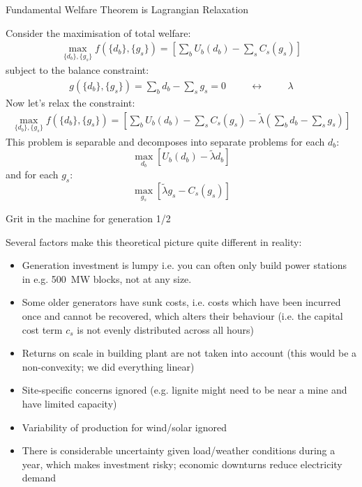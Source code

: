\documentclass[10pt,aspectratio=169,dvipsnames]{beamer}
\def\l{\lambda}
\let\olditem\item
\renewcommand{\item}{%
\olditem\vspace{5pt}}
\begin{document}
\begin{frame}{Fundamental Welfare Theorem is Lagrangian Relaxation}

  Consider the maximisation of total welfare:
  \begin{align*}
    \max_{\{d_b\}, \{g_s\}} f(\{d_b\}, \{g_s\}) = \left[ \sum_b U_b (d_b)  -  \sum_s C_s (g_s) \right]
  \end{align*}
  subject to the balance constraint:
  \begin{align*}
    g(\{d_b\}, \{g_s\}) = \sum_b d_b -  \sum_s g_s  = 0 \hspace{1cm} \leftrightarrow \hspace{1cm} \l
  \end{align*}
  Now let's relax the constraint:
  \begin{align*}
    \max_{\{d_b\}, \{g_s\}} f(\{d_b\}, \{g_s\}) = \left[ \sum_b U_b (d_b)  -  \sum_s C_s (g_s) - \tilde\lambda ( \sum_b d_b -  \sum_s g_s) \right]
  \end{align*}
  This problem is \alert{separable} and \alert{decomposes} into separate problems for each $d_b$:
  \begin{equation*}
    \max_{d_b} \left[ U_b(d_b) - \tilde\lambda d_b\right]
  \end{equation*}
  and for each $g_s$:
  \begin{equation*}
    \max_{g_s} \left[ \tilde\lambda g_s  -  C_s(g_s)\right]
  \end{equation*}

\end{frame}

\begin{frame}{Grit in the machine for generation 1/2}

  Several factors make this theoretical picture quite different in reality:
  \begin{itemize}
  \item Generation investment is \alert{lumpy} i.e. you can often only
    build power stations in e.g. 500~MW blocks, not at any size.
  \item Some older generators have \alert{sunk costs}, i.e. costs which have been incurred once and cannot be recovered, which alters their behaviour (i.e. the capital cost term $c_s$ is not evenly distributed across all hours)
  \item Returns on scale in building plant are not taken into account (this would be a non-convexity; we did everything linear)
  \item Site-specific concerns ignored (e.g. lignite might need to be near a mine and have limited capacity)
  \item Variability of production for wind/solar ignored
    \item There is considerable  uncertainty given load/weather conditions during a year, which makes investment risky; economic downturns reduce electricity demand
  \end{itemize}

\end{frame}
\end{document}
